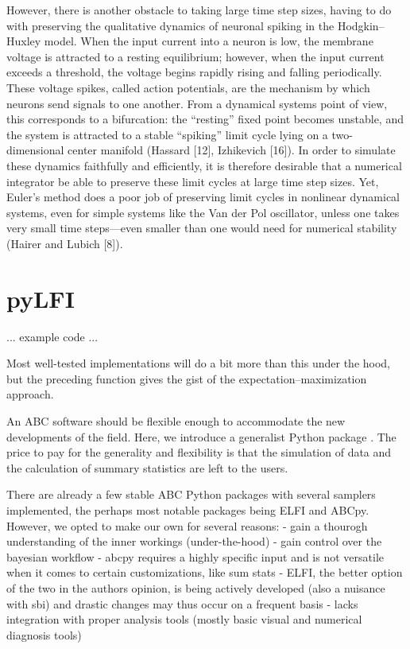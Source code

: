 However, there is another obstacle to taking large time step sizes, having to do with
preserving the qualitative dynamics of neuronal spiking in the Hodgkin–Huxley model.
When the input current into a neuron is low, the membrane voltage is attracted to a
resting equilibrium; however, when the input current exceeds a threshold, the voltage begins
rapidly rising and falling periodically. These voltage spikes, called action potentials, are the
mechanism by which neurons send signals to one another. From a dynamical systems point
of view, this corresponds to a bifurcation: the “resting” fixed point becomes unstable, and
the system is attracted to a stable “spiking” limit cycle lying on a two-dimensional center
manifold (Hassard [12], Izhikevich [16]). In order to simulate these dynamics faithfully and
efficiently, it is therefore desirable that a numerical integrator be able to preserve these limit
cycles at large time step sizes. Yet, Euler’s method does a poor job of preserving limit cycles
in nonlinear dynamical systems, even for simple systems like the Van der Pol oscillator,
unless one takes very small time steps—even smaller than one would need for numerical
stability (Hairer and Lubich [8]).

\section{pyLFI}\label{sec:pylfi}

... example code ...

Most well-tested implementations will do a bit more than this under the hood, but the preceding function gives the gist of the expectation–maximization approach.

An ABC software should be flexible enough to accommodate the new developments of the field. Here, we introduce a generalist Python package . The price to pay for the generality and flexibility is that the simulation of data and the calculation of summary statistics are left to the users. 

There are already a few stable ABC Python packages with several samplers implemented, the perhaps most notable packages being ELFI and ABCpy. However, we opted to make our own for several reasons:
- gain a thourogh understanding of the inner workings (under-the-hood)
- gain control over the bayesian workflow 
- abcpy requires a highly specific input and is not versatile when it comes to certain customizations, like sum stats
- ELFI, the better option of the two in the authors opinion, is being actively developed (also a nuisance with sbi) and drastic changes may thus occur on a frequent basis
- lacks integration with proper analysis tools (mostly basic visual and numerical diagnosis tools)

